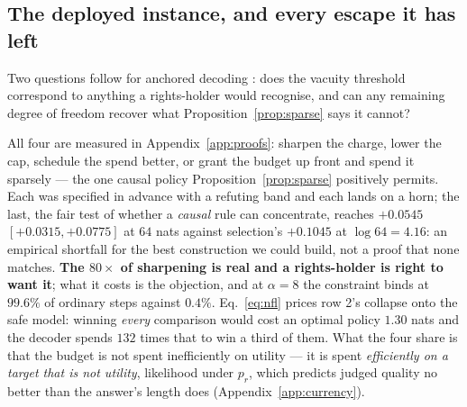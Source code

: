 
\subsection{The deployed instance, and every escape it has left}\label{sec:orders}

Two questions follow for anchored decoding \citep{he2026anchored}: does the vacuity threshold
correspond to anything a rights-holder would recognise, and can any remaining degree of freedom
recover what Proposition~\ref{prop:sparse} says it cannot?





All four are measured in Appendix~\ref{app:proofs}: sharpen the charge,
lower the cap, schedule the spend better, or grant the budget up front and spend it sparsely --- the
one causal policy Proposition~\ref{prop:sparse} positively permits. Each was specified in advance with a refuting band and each lands on a
horn; the last, the fair test of whether a \emph{causal} rule can concentrate, reaches $+0.0545$ $[+0.0315, +0.0775]$ at $64$
nats against selection's $+0.1045$ at $\log 64 = 4.16$: an empirical shortfall for the best
construction we could build, not a proof that none matches. \textbf{The $80\times$ of sharpening is real and a rights-holder is right to want it}; what it costs is
the objection, and at $\alpha=8$ the constraint binds at $99.6\%$ of ordinary steps against $0.4\%$.
Eq.~\eqref{eq:nfl} prices row 2's collapse onto the safe model: winning \emph{every} comparison would
cost an optimal policy $1.30$ nats and the decoder spends $132$ times that to win a third of them.
What the four share is that the budget is not spent inefficiently on utility --- it is spent
\emph{efficiently on a target that is not utility}, likelihood under $p_r$, which predicts judged
quality no better than the answer's length does (Appendix~\ref{app:currency}).
